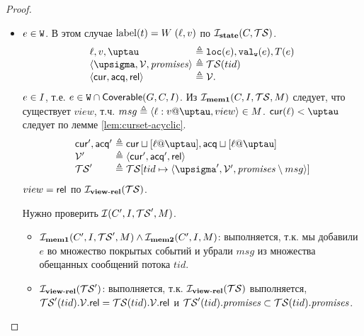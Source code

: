 \begin{proof}
\begin{itemize}
        \item $e \in {\mathtt{W}}$.
          В этом случае ${\rm label}(t) = W \; (\ell, v)$ по $\mathcal{I}_{\rm \bf state}(C, \mathcal{TS})$.
          \[\begin{array}{l@{~}l}
            \loc, \val, \tau        & \defeq \lLOC(e), \lVALW(e), T(e) \\
            \tup{\pstate, \View, \PromSet} & \defeq \TSf(tid) \\
            \tup{\viewCur, \viewAcq, \viewRel} & \defeq \View. \\
          \end{array}\]
          $e \in I$, т.е. $e \in {\mathtt{W}} \cap {\sf Coverable}(G, C, I)$.
          Из $\mathcal{I}_{\rm \bf mem1}(C, I, \mathcal{TS}, M)$ следует, что существует $view$, т.ч.
          $msg \defeq \msg{\loc}{\val}{\tau}{view} \in M$.
          $\viewCur(\loc) < \tau$ следует по лемме \ref{lem:curset-acyclic}.
          \[\begin{array}{l@{~}l}
            \viewCur', \viewAcq' & \defeq \viewCur \sqcup [\loc @ \tau], \viewAcq \sqcup [\loc @ \tau] \\
            \View'    & \defeq \tup{\viewCur', \viewAcq', \viewRel} \\
            \TSf'     & \defeq \TSf[tid \mapsto \tup{\pstate', \View', \PromSet \setminus msg}] \\
          \end{array}\]
          $view = {\sf rel}$ по $\mathcal{I}_{\rm \bf view\text{-}rel}(\mathcal{TS})$.

          Нужно проверить $\mathcal{I}(C', I, \mathcal{TS}', M)$.
        \begin{itemize}
        \item $\mathcal{I}_{\rm \bf mem1}(C', I, \mathcal{TS}', M) \land \mathcal{I}_{\rm \bf mem2}(C', I, M)$:
          выполняется, т.к. мы добавили $e$ во множество покрытых событий и убрали $msg$ из множества
          обещанных сообщений потока $tid$.

        \item $\mathcal{I}_{\rm \bf view\text{-}rel}(\mathcal{TS}')$: выполняется, т.к. $\mathcal{I}_{\rm \bf view\text{-}rel}(\mathcal{TS})$ выполняется, \\
          $\mathcal{TS}'(tid).\mathcal{V}.{\sf rel} = \mathcal{TS}(tid).\mathcal{V}.{\sf rel}$ и
          $\mathcal{TS}'(tid).\mathit{promises} \subset \mathcal{TS}(tid).\mathit{promises}$.


\end{itemize}
\end{itemize}
\end{proof}
